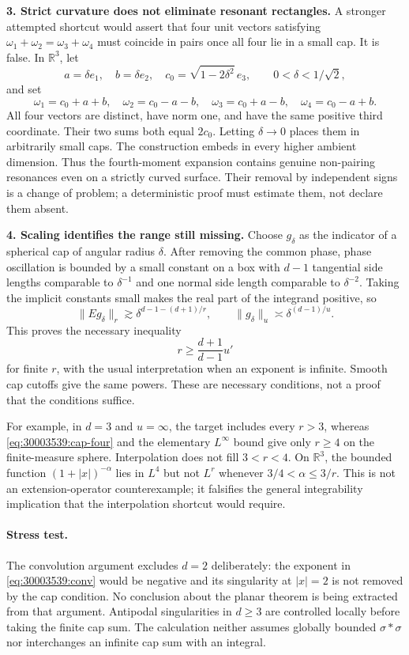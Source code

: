 \documentclass[11pt,a4paper]{article}
\newcommand{\R}{\mathbb{R}}
\numberwithin{equation}{section}
\begin{document}
\textbf{3. Strict curvature does not eliminate resonant rectangles.}
A stronger attempted shortcut would assert that four unit vectors satisfying
$\omega_1+\omega_2=\omega_3+\omega_4$ must coincide in pairs once all four
lie in a small cap. It is false. In $\R^3$, let
\[
 a=\delta e_1,\quad b=\delta e_2,\quad
 c_0=\sqrt{1-2\delta^2}\,e_3,\qquad 0<\delta<1/\sqrt2,
\]
and set
\[
 \omega_1=c_0+a+b,\quad \omega_2=c_0-a-b,\quad
 \omega_3=c_0+a-b,\quad \omega_4=c_0-a+b.
\]
All four vectors are distinct, have norm one, and have the same positive
third coordinate. Their two sums both equal $2c_0$. Letting $\delta\to0$
places them in arbitrarily small caps. The construction embeds in every
higher ambient dimension. Thus the fourth-moment expansion contains genuine
non-pairing resonances even on a strictly curved surface. Their removal by
independent signs is a change of problem; a deterministic proof must estimate
them, not declare them absent.

\textbf{4. Scaling identifies the range still missing.}
Choose $g_\delta$ as the indicator of a spherical cap of angular radius
$\delta$. After removing the common phase, phase oscillation is bounded by
a small constant on a box with $d-1$ tangential side lengths comparable to
$\delta^{-1}$ and one normal side length comparable to $\delta^{-2}$.
Taking the implicit constants small makes the real part of the integrand
positive, so
\[
 \|Eg_\delta\|_r\gtrsim
 \delta^{d-1-(d+1)/r},\qquad
 \|g_\delta\|_u\asymp\delta^{(d-1)/u}.
\]
This proves the necessary inequality
\begin{equation}\label{eq:30003539:knapp}
 r\ge\frac{d+1}{d-1}u'
\end{equation}
for finite $r$, with the usual interpretation when an exponent is infinite.
Smooth cap cutoffs give the same powers. These are necessary conditions,
not a proof that the conditions suffice.

For example, in $d=3$ and $u=\infty$, the target includes every $r>3$,
whereas \eqref{eq:30003539:cap-four} and the elementary $L^\infty$ bound give only
$r\ge4$ on the finite-measure sphere. Interpolation does not fill $3<r<4$.
On $\R^3$, the bounded function $(1+|x|)^{-\alpha}$ lies in $L^4$ but not
$L^r$ whenever $3/4<\alpha\le3/r$. This is not an extension-operator
counterexample; it falsifies the general integrability implication that the
interpolation shortcut would require.

\paragraph{Stress test.}
The convolution argument excludes $d=2$ deliberately: the exponent in
\eqref{eq:30003539:conv} would be negative and its singularity at $|x|=2$ is not
removed by the cap condition. No conclusion about the planar theorem is
being extracted from that argument. Antipodal singularities in $d\ge3$
are controlled locally before taking the finite cap sum. The calculation
neither assumes globally bounded $\sigma*\sigma$ nor interchanges an
infinite cap sum with an integral.
\end{document}
